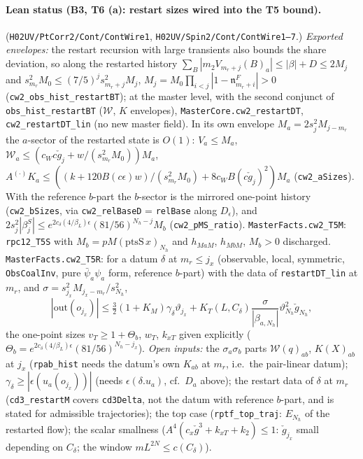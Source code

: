 \documentclass[11pt]{amsart}
\theoremstyle{definition}
\theoremstyle{remark}
\numberwithin{equation}{section}
\begin{document}
\paragraph{Lean status (B3, T6 (a): restart sizes wired into the T5 bound).}
(\texttt{H02UV/PtCorr2/Cont/ContWire1}, \texttt{H02UV/Spin2/Cont/ContWire1--7}.) \emph{Exported envelopes:} the restart recursion with
large transients also bounds the share deviation, so along the restarted history $\sum_B|m_2V_{m_r+j}(B)_a|\le
|\beta|+D\le2M_j$ and $s_{m_r}^2M_0\le(7/5)^js_{m_r+j}^2M_j$, $M_j=M_0\prod_{i<j}|1-\mathfrak n^F_{m_r+i}|>0$
(\texttt{cw2\_obs\_hist\_restartBT}); at the master level, with the second conjunct of \texttt{obs\_hist\_restartBT}
($\mathcal W$, $K$ envelopes), \texttt{MasterCore.cw2\_restartDT}, \texttt{cw2\_restartDT\_lin} (no new master field).
In its own envelope $M_a=2s_j^2M_{j-m_r}$ the $a$-sector of the restarted state is $O(1)$: $V_a\le M_a$,
$\mathcal W_a\le(c_W c\check g_j+w/(s_{m_r}^2M_0))M_a$, $A^{(\cdot)}K_a\le((k+120B(c\epsilon)w)/(s_{m_r}^2M_0)+8c_WB(c\check g_j)^2)M_a$
(\texttt{cw2\_aSizes}). With the reference $b$-part the $b$-sector is the mirrored one-point history
(\texttt{cw2\_bSizes}, via \texttt{cw2\_relBaseD} = \texttt{relBase} along $D_\epsilon$), and
$2s_j^2|\beta^S_j|\le e^{2c_\delta(4/\beta_L)\epsilon}(81/56)^{N_h-j}M_b$ (\texttt{cw2\_pMS\_ratio}).
\texttt{MasterFacts.cw2\_T5M}: \texttt{rpc12\_T5S} with $M_b=pM(\mathrm{ptsS}\,x)_{N_h}$ and $h_{MaM}$, $h_{MbM}$,
$M_b>0$ discharged. \texttt{MasterFacts.cw2\_T5R}: for a datum $\delta$ at $m_r\le j_x$ (observable, local, symmetric,
\texttt{ObsCoalInv}, pure $\bar\psi_a\psi_a$ form, reference $b$-part) with the data of \texttt{restartDT\_lin} at $m_r$,
and $\sigma=s_{j_x}^2M_{j_x-m_r}/s_{N_h}^2$,
\[
|\mathrm{out}(o_{j_x})|\le\tfrac32(1+K_M)\gamma_\delta\vartheta_{j_x}+K_T(L,C_\delta)\frac{\sigma}{|\beta_{a,N_h}|}
\vartheta_{N_h}^2\check g_{N_h},
\]
the one-point sizes $v_T\ge1+\Theta_b$, $w_T$, $k_{xT}$ given explicitly ($\Theta_b=e^{2c_\delta(4/\beta_L)\epsilon}(81/56)^{N_h-j_x}$).
\emph{Open inputs:} the $\sigma_a\sigma_b$ parts $\mathcal W(q)_{ab}$, $K(X)_{ab}$ at $j_x$ (\texttt{rpab\_hist} needs the
datum's own $K_{ab}$ at $m_r$, i.e.\ the pair-linear datum); $\gamma_\delta\ge|\epsilon(u_a(o_{j_x}))|$ (needs
$\epsilon(\delta.u_a)$, cf.\ $D_a$ above); the restart data of $\delta$ at $m_r$ (\texttt{cd3\_restartM} covers
\texttt{cd3Delta}, not the datum with reference $b$-part, and is stated for admissible trajectories); the top case
(\texttt{rptf\_top\_traj}: $E_{N_h}$ of the restarted flow); the scalar smallness ($A^4(c_x\check g^3+k_{xT}+k_2)\le1$:
$\check g_{j_x}$ small depending on $C_\delta$; the window $m L^{2N}\le c(C_\delta)$).
\end{document}
